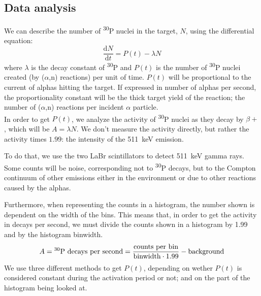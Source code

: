\documentclass[a4paper,12pt]{report}
\newcommand{\dif}{\text{d}}
\newcommand{\ddt}[1]{\frac{\dif #1}{\dif t}}
\newcommand{\an}{($\alpha$,n) }
\newcommand{\Piso}{\textsuperscript{30}P }
\begin{document}
\subsection{Data analysis}
We can describe the number of \Piso nuclei in the target, $N$, using the differential equation:
\begin{equation}
	\ddt{N} = P(t) -\lambda N
	\label{activation_diffeq}
\end{equation}
where $\lambda$ is the decay constant of \Piso and $P(t)$ is the number of \Piso nuclei created (by \an reactions) per unit of time.
$P(t)$ will be proportional to the current of alphas hitting the target.
If expressed in number of alphas per second, the proportionality constant will be the thick target yield of the reaction; the number of \an reactions per incident $\alpha$ particle.
\\

In order to get $P(t)$, we analyze the activity of \Piso nuclei as they decay by $\beta +$, which will be $A = \lambda N$.
We don't measure the activity directly, but rather the activity times $1.99$: the intensity of the \qty{511}{\keV} emission.	%

To do that, we use the two LaBr scintillators to detect \qty{511}{\keV} gamma rays.
Some counts will be noise, corresponding not to \Piso decays, but to the Compton continuum of other emissions either in the environment or due to other reactions caused by the alphas.

Furthermore, when representing the counts in a histogram, the number shown is dependent on the width of the bins.
This means that, in order to get the activity in decays per second, we must divide the counts shown in a histogram by 1.99 and by the histogram binwidth.
\begin{equation}
	A = \text{\Piso decays per second} = \frac{\text{counts per bin}}{\text{binwidth}\cdot\num{1.99}} - \text{background}
\end{equation}
We use three different methods to get $P(t)$, depending on wether $P(t)$ is considered constant during the activation period or not; and on the part of the histogram being looked at.
\end{document}
